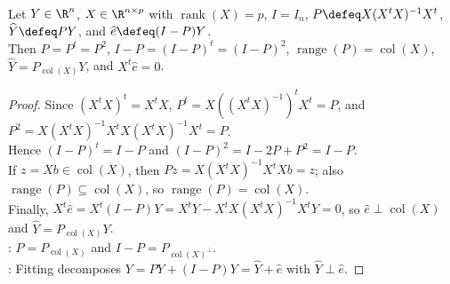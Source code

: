 \begin{proposition} \label{prop:hat-matrix-projection-properties} \\
Let $Y\in\R^n$, $X\in\R^{n\times p}$ with $\operatorname{rank}(X)=p$, $I=I_n$, $P\defeq X(X^tX)^{-1}X^t$, $\widehat{Y}\defeq PY$, and $\widehat{e}\defeq(I-P)Y$.\\
Then $P=P^t=P^2$, $I-P=(I-P)^t=(I-P)^2$, $\operatorname{range}(P)=\operatorname{col}(X)$, $\widehat{Y}=P_{\operatorname{col}(X)}Y$, and $X^t\widehat{e}=0$.
\begin{proof} Since $(X^tX)^t=X^tX$, $P^t=X((X^tX)^{-1})^tX^t=P$, and $P^2=X(X^tX)^{-1}X^tX(X^tX)^{-1}X^t=P$.\\
Hence $(I-P)^t=I-P$ and $(I-P)^2=I-2P+P^2=I-P$.\\
If $z=Xb\in\operatorname{col}(X)$, then $Pz=X(X^tX)^{-1}X^tXb=z$; also $\operatorname{range}(P)\subseteq\operatorname{col}(X)$, so $\operatorname{range}(P)=\operatorname{col}(X)$.\\
Finally, $X^t\widehat{e}=X^t(I-P)Y=X^tY-X^tX(X^tX)^{-1}X^tY=0$, so $\widehat{e}\perp\operatorname{col}(X)$ and $\widehat{Y}=P_{\operatorname{col}(X)}Y$.\\
: $P=P_{\operatorname{col}(X)}$ and $I-P=P_{\operatorname{col}(X)^\perp}$.\\
: Fitting decomposes $Y=PY+(I-P)Y=\widehat{Y}+\widehat{e}$ with $\widehat{Y}\perp\widehat{e}$.
\end{proof}
\end{proposition}

